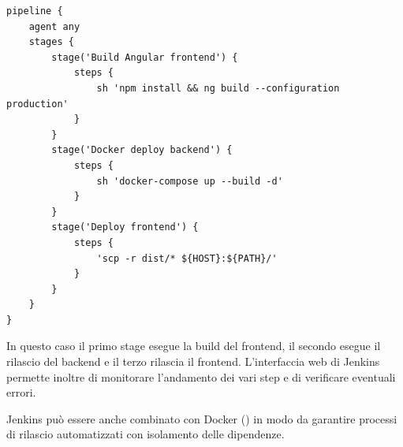 \vspace{1mm}
\begin{lstlisting}[]
pipeline {
    agent any
    stages {
		stage('Build Angular frontend') {
			steps {
			    sh 'npm install && ng build --configuration production'
			}
		}
		stage('Docker deploy backend') {
			steps {
				sh 'docker-compose up --build -d'
			}
		}
		stage('Deploy frontend') {
			steps {
			    'scp -r dist/* ${HOST}:${PATH}/'
			}
		}
    }
}
\end{lstlisting}

In questo caso il primo stage esegue la build del frontend, il secondo esegue il rilascio del backend e il terzo rilascia il frontend. L'interfaccia web di Jenkins permette inoltre di monitorare l'andamento dei vari step e di verificare eventuali errori.

Jenkins può essere anche combinato con Docker (\cite{docker}) in modo da garantire processi di rilascio automatizzati con isolamento delle dipendenze.

